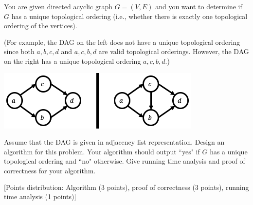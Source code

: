 \documentclass[answers]{exam}
\newenvironment{answer}{%
     \renewcommand{\solutiontitle}{\noindent\textbf{Answer:}\enspace}
     \begin{solution}
     }{%
     \end{solution}
     \renewcommand{\solutiontitle}{\noindent\textbf{Solution:}\enspace}
 }
\begin{document}
\begin{questions}

\question[7]

You are given directed acyclic graph $G = (V, E)$ and you want to determine if $G$ has a unique topological ordering (i.e., whether there is exactly one topological ordering of the vertices).

(For example, the DAG on the left  does not have a unique topological ordering since both $a, b, c, d$ and $a, c, b, d$ are valid topological orderings. However, the DAG on the right has a unique
    topological ordering $a, c, b, d$.)

    \begin{center}
        \includegraphics[scale=0.5]{minor/graph.png}
    \end{center}

Assume that the DAG is given in adjacency list representation. Design an algorithm for this problem. Your algorithm should output ``yes" if $G$ has a unique topological ordering and ``no" otherwise. Give running time analysis and proof of correctness for your algorithm.

[Points distribution: Algorithm (3 points), proof of correctness (3 points), running time analysis (1 points)]


\end{questions}
\end{document}
